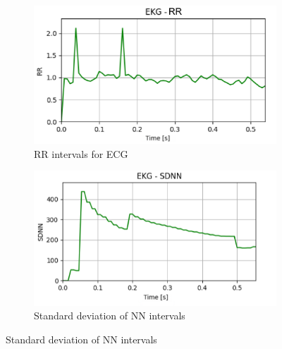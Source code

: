 \documentclass[journal]{IEEEtran}
\begin{document}
\begin{figure}[h]
    \centering
    \begin{subfigure}{0.47\textwidth}
        \centering
        \includegraphics[width=\linewidth]{MEAN_EKG.png}
        \caption{RR intervals for ECG}
    \end{subfigure}
    
   \vspace{0.2cm} 
    \begin{subfigure}{0.49\textwidth}
        \centering
        \includegraphics[width=\linewidth]{SDNN_EKG.png}
        \caption{Standard deviation of NN intervals}
    \end{subfigure}
    

\end{figure}
\end{document}
